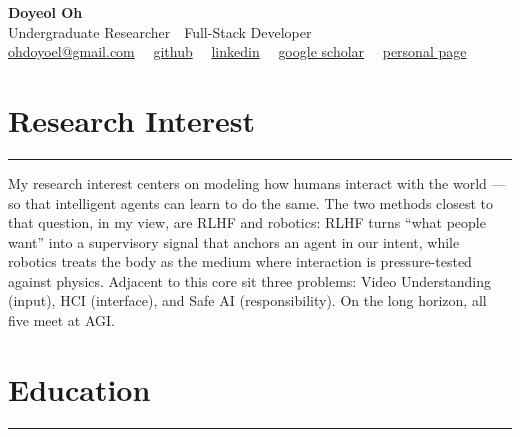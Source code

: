 \documentclass[11pt,letterpaper]{article}
\begin{document}
\pagestyle{empty}

\begin{center}
  {\LARGE\bfseries Doyeol Oh}\\[4pt]
  {\normalsize Undergraduate Researcher\ \textbar\ Full-Stack Developer}\\[6pt]
  \small
  \href{mailto:ohdoyoel@gmail.com}{ohdoyoel@gmail.com}
  \ \textbar\
  \href{https://github.com/ohdoyoel}{github}
  \ \textbar\
  \href{https://linkedin.com/in/ohdoyoel}{linkedin}
  \ \textbar\
  \href{https://scholar.google.com/citations?user=Ld0QNwcAAAAJ}{google scholar}
  \ \textbar\
  \href{https://ohdoyoel.github.io/}{personal page}
\end{center}

\vspace{-4pt}

\vspace{4pt}
\section*{Research Interest}
\vspace{-4pt}
\rule{\textwidth}{0.5pt}\vspace{2pt}

My research interest centers on modeling how humans interact with the world --- so that
intelligent agents can learn to do the same. The two methods closest to that question, in
my view, are RLHF and robotics: RLHF turns ``what people want'' into a supervisory signal
that anchors an agent in our intent, while robotics treats the body as the medium where
interaction is pressure-tested against physics. Adjacent to this core sit three problems:
Video Understanding (input), HCI (interface), and Safe AI (responsibility). On the long
horizon, all five meet at AGI.

\vspace{4pt}
\section*{Education}
\vspace{-4pt}
\rule{\textwidth}{0.5pt}\vspace{2pt}
\end{document}
